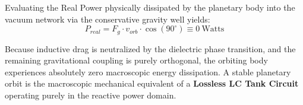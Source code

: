 Evaluating the Real Power physically dissipated by the planetary body into the vacuum
network via the conservative gravity well yields:
\begin{equation}
P_{real} = F_g \cdot v_{orb} \cdot \cos(90^\circ) \equiv 0\ \text{Watts}
\end{equation}

Because inductive drag is neutralized by the dielectric phase transition, and the remaining
gravitational coupling is purely orthogonal, the orbiting body experiences absolutely zero
macroscopic energy dissipation. A stable planetary orbit is the macroscopic mechanical
equivalent of a \textbf{Lossless LC Tank Circuit} operating purely in the reactive power domain.